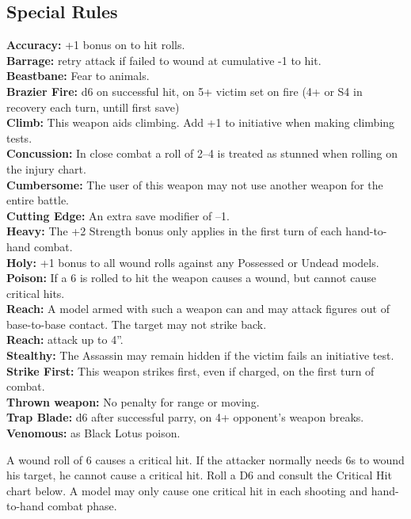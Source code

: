 \subsection*{Special Rules}
{\small \textbf{Accuracy:} +1 bonus on to hit rolls. \\
\textbf{Barrage:} retry attack if failed to wound at cumulative -1 to hit. \\
\textbf{Beastbane:} Fear to animals. \\
\textbf{Brazier Fire:} d6 on successful hit, on 5+ victim set on fire (4+ or S4 in recovery each turn, untill first save) \\
\textbf{Climb:} This weapon aids climbing. Add +1 to initiative when making climbing tests. \\
\textbf{Concussion:} In close combat a roll of 2–4 is treated as stunned when rolling on the injury chart. \\
\textbf{Cumbersome:} The user of this weapon may not use another weapon for the entire battle. \\
\textbf{Cutting Edge:} An extra save modifier of –1. \\
\textbf{Heavy:} The +2 Strength bonus only applies in the first turn of each hand-to-hand combat. \\
\textbf{Holy:} +1 bonus to all wound rolls against any Possessed or Undead models. \\
\textbf{Poison:} If a 6 is rolled to hit the weapon causes a wound, but cannot cause critical hits. \\
\textbf{Reach:} A model armed with such a weapon can and may attack figures out of base-to-base contact. The target may not strike back. \\
\textbf{Reach:} attack up to 4”. \\
\textbf{Stealthy:} The Assassin may remain hidden if the victim fails an initiative test. \\
\textbf{Strike First:} This weapon strikes first, even if charged, on the first turn of combat. \\
\textbf{Thrown weapon:} No penalty for range or moving. \\
\textbf{Trap Blade:} d6 after successful parry, on 4+ opponent's weapon breaks. \\
\textbf{Venomous:} as Black Lotus poison.}

{\small A wound roll of 6 causes a critical hit. If the attacker normally needs 6s to
wound his target, he cannot cause a critical hit. Roll a D6
and consult the Critical Hit chart below. A model
may only cause one critical hit in each shooting and
hand-to-hand combat phase.}

